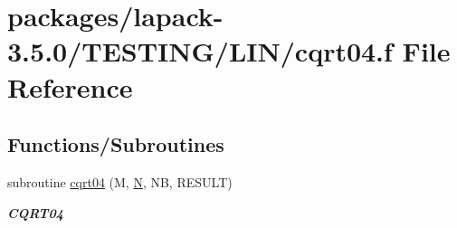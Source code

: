 \hypertarget{cqrt04_8f}{}\section{packages/lapack-\/3.5.0/\+T\+E\+S\+T\+I\+N\+G/\+L\+I\+N/cqrt04.f File Reference}
\label{cqrt04_8f}
\subsection*{Functions/\+Subroutines}
\begin{DoxyCompactItemize}
\item 
subroutine \hyperlink{group__complex__lin_ga138dd9a546d9e5d285886e2e0536b7c6}{cqrt04} (M, \hyperlink{polmisc_8c_a0240ac851181b84ac374872dc5434ee4}{N}, N\+B, R\+E\+S\+U\+L\+T)
\begin{DoxyCompactList}\small\item\em {\bfseries C\+Q\+R\+T04} \end{DoxyCompactList}\end{DoxyCompactItemize}
